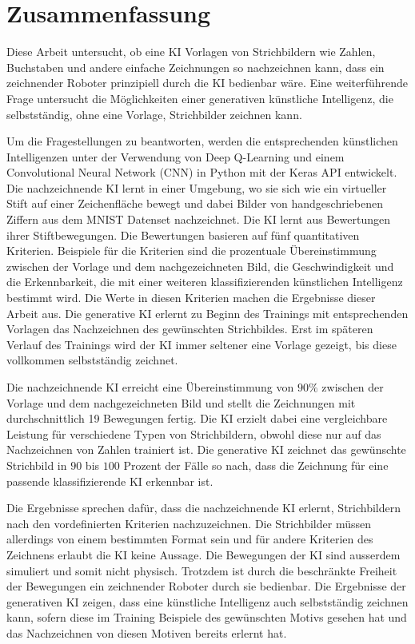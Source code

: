 \chapter{Zusammenfassung}\label{zusammenfassung}

Diese Arbeit untersucht, ob eine KI Vorlagen von Strichbildern wie Zahlen,
Buchstaben und andere einfache Zeichnungen so nachzeichnen kann, dass ein
zeichnender Roboter prinzipiell durch die KI bedienbar wäre. Eine weiterführende
Frage untersucht die Möglichkeiten einer generativen künstliche Intelligenz, die
selbstständig, ohne eine Vorlage, Strichbilder zeichnen kann.
 
Um die Fragestellungen zu beantworten, werden die entsprechenden künstlichen
Intelligenzen unter der Verwendung von Deep Q-Learning und einem Convolutional
Neural Network (CNN) in Python mit der Keras API entwickelt. Die nachzeichnende
KI lernt in einer Umgebung, wo sie sich wie ein virtueller Stift auf einer
Zeichenfläche bewegt und dabei Bilder von handgeschriebenen Ziffern aus dem
MNIST Datenset nachzeichnet. Die KI lernt aus Bewertungen ihrer Stiftbewegungen.
Die Bewertungen basieren auf fünf quantitativen Kriterien. Beispiele für die
Kriterien sind die prozentuale Übereinstimmung zwischen der Vorlage und dem
nachgezeichneten Bild, die Geschwindigkeit und die Erkennbarkeit, die mit einer
weiteren klassifizierenden künstlichen Intelligenz bestimmt wird. Die Werte in
diesen Kriterien machen die Ergebnisse dieser Arbeit aus. Die generative KI
erlernt zu Beginn des Trainings mit entsprechenden Vorlagen das Nachzeichnen des
gewünschten Strichbildes. Erst im späteren Verlauf des Trainings wird der KI
immer seltener eine Vorlage gezeigt, bis diese vollkommen selbstständig
zeichnet. 
 
Die nachzeichnende KI erreicht eine Übereinstimmung von $90\%$ zwischen der
Vorlage und dem nachgezeichneten Bild und stellt die Zeichnungen mit
durchschnittlich 19 Bewegungen fertig. Die KI erzielt dabei eine vergleichbare
Leistung für verschiedene Typen von Strichbildern, obwohl diese nur auf das
Nachzeichnen von Zahlen trainiert ist. Die generative KI zeichnet das gewünschte
Strichbild in $90$ bis $100$ Prozent der Fälle so nach, dass die Zeichnung für eine
passende klassifizierende KI erkennbar ist.

Die Ergebnisse sprechen dafür, dass die nachzeichnende KI erlernt, Strichbildern
nach den vordefinierten Kriterien nachzuzeichnen. Die Strichbilder müssen
allerdings von einem bestimmten Format sein und für andere Kriterien des
Zeichnens erlaubt die KI keine Aussage. Die Bewegungen der KI sind ausserdem
simuliert und somit nicht physisch. Trotzdem ist durch die beschränkte Freiheit
der Bewegungen ein zeichnender Roboter durch sie bedienbar. Die Ergebnisse der
generativen KI zeigen, dass eine künstliche Intelligenz auch selbstständig
zeichnen kann, sofern diese im Training Beispiele des gewünschten Motivs gesehen
hat und das Nachzeichnen von diesen Motiven bereits erlernt hat.
 
